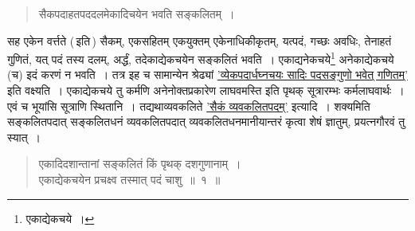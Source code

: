 \documentclass[10pt, openany]{book}
\begin{document}
{

 \label{14.1}
\begin{quote}
{\bs सैकपदाहतपददलमेकादिचयेन भवति सङ्कलितम्~। }
\end{quote}

{सह एकेन वर्त्तते (\,इति\,) सैकम्, एकसहितम् एकयुक्तम् एकेनाधिकीकृतम्,
यत्पदं, गच्छः}
{अवधिः, तेनाहतं गुणितं, यत् पदं तस्य दलम्, अर्द्धं, तदेकाद्येकचयेन
सङ्कलितं भवति~। एकाद्यनेकचये\renewcommand{\thefootnote}{\s ८}\footnote{\s एकाद्येकचये~।}  
अनेकाद्येकचये (च) इदं करणं न भवति~। तत्र इह च सामान्येन
श्रेढ्यां \hyperref[85]{'व्येकपदार्धघ्नचयः सादिः पदसङ्गुणो भवेत् गणितम्'} इति वक्ष्यति~। एकाद्येकचये तु कर्मणि अनेनोक्तप्रकारेण लाघवमस्ति इति पृथक् सूत्रारम्भः कर्मलाघवार्थः~। एवं च भूयांसि सूत्राणि स्थितानि~। तद्यथा\textemdash व्यवकलिते \hyperref[16]{'सैकं व्यवकलितपदम्'} इत्यादि~। शक्यमिति
सङ्कलितपदात् सङ्कलितधनं व्यवकलितपदात् व्यवकलितधनमानीयान्तरं कृत्वा शेषं ज्ञातुम्, प्रयत्नगौरवं तु स्यात्~।}


\newpage


\begin{quote}
    
{\eg एकादिदशान्तानां सङ्कलितं किं पृथक् दशगुणानाम्~। \\
 एकाद्येकचयेन प्रचक्ष्व तस्मात् पदं चाशु~॥~१~॥}\end{quote}

}
\end{document}
